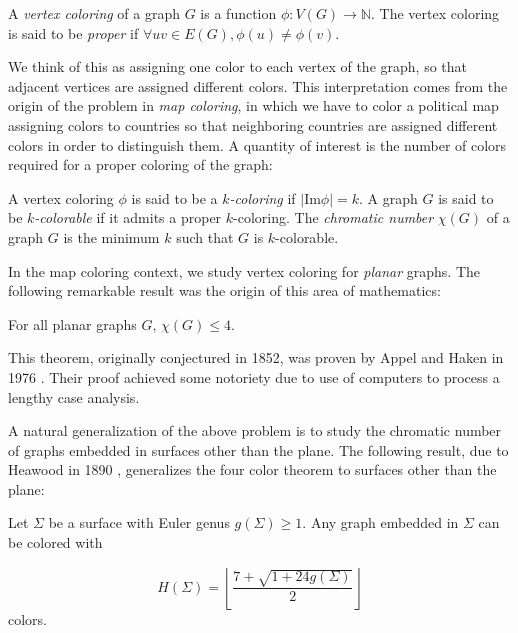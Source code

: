 \begin{definition}
A \emph{vertex coloring} of a graph $G$ is a function $\phi : V(G) \rightarrow \mathbb{N}$. The vertex coloring is said to be \emph{proper} if $\forall uv \in E(G), \phi(u) \neq \phi(v)$. 
\end{definition}

We think of this as assigning one color to each vertex of the graph, so that adjacent vertices are assigned different colors. This interpretation comes from the origin of the problem in \textit{map coloring}, in which we have to color a political map assigning colors to countries so that neighboring countries are assigned different colors in order to distinguish them. A quantity of interest is the number of colors required for a proper coloring of the graph:

\begin{definition}
A vertex coloring $\phi$ is said to be a $k$\emph{-coloring} if $|\text{Im} \phi| = k$. A graph $G$ is said to be $k$\emph{-colorable} if it admits a proper $k$-coloring. The \emph{chromatic number} $\chi(G)$ of a graph $G$ is the minimum $k$ such that $G$ is $k$-colorable. 
\end{definition}

In the map coloring context, we study vertex coloring for \emph{planar} graphs. The following remarkable result was the origin of this area of mathematics:

\begin{theorem}
For all planar graphs $G$, $\chi(G) \leq 4$.
\end{theorem}

This theorem, originally conjectured in 1852, was proven by Appel and Haken in 1976 \cite{4ct1, 4ct2}. Their proof achieved some notoriety due to use of computers to process a lengthy case analysis. 

A natural generalization of the above problem is to study the chromatic number of graphs embedded in surfaces other than the plane. The following result, due to Heawood in 1890 \cite{heawoodmapcolour}, generalizes the four color theorem to surfaces other than the plane:

\begin{theorem}[Heawood]
Let $\Sigma$ be a surface with Euler genus $g(\Sigma) \geq 1$. Any graph embedded in $\Sigma$ can be colored with

$$
H(\Sigma) = \left\lfloor \frac{7 + \sqrt{1+24g(\Sigma)}}{2} \right\rfloor
$$
colors.
\end{theorem}


